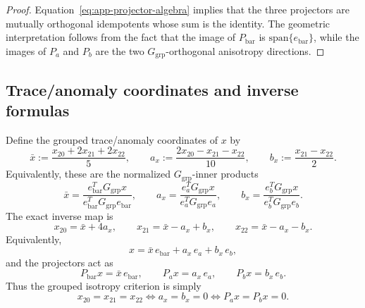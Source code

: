 \documentclass[11pt]{article}
\theoremstyle{definition}
\newcommand{\Span}{\mathrm{span}}
\begin{document}
\begin{proof}
Equation~\eqref{eq:app-projector-algebra} implies that the three projectors are mutually orthogonal idempotents whose sum is the identity. The geometric interpretation follows from the fact that the image of $P_{\mathrm{bar}}$ is $\Span\{e_{\mathrm{bar}}\}$, while the images of $P_a$ and $P_b$ are the two $G_{\mathrm{grp}}$-orthogonal anisotropy directions.
\end{proof}

\subsection{Trace/anomaly coordinates and inverse formulas}

Define the grouped trace/anomaly coordinates of $x$ by
\begin{equation}
 \bar x:=\frac{x_{20}+2x_{21}+2x_{22}}{5},
 \qquad
 a_x:=\frac{2x_{20}-x_{21}-x_{22}}{10},
 \qquad
 b_x:=\frac{x_{21}-x_{22}}{2}.
 \label{eq:app-trace-anomaly-def}
\end{equation}
Equivalently, these are the normalized $G_{\mathrm{grp}}$-inner products
\begin{equation}
 \bar x=\frac{e_{\mathrm{bar}}^T G_{\mathrm{grp}} x}{e_{\mathrm{bar}}^T G_{\mathrm{grp}} e_{\mathrm{bar}}},
 \qquad
 a_x=\frac{e_a^T G_{\mathrm{grp}} x}{e_a^T G_{\mathrm{grp}} e_a},
 \qquad
 b_x=\frac{e_b^T G_{\mathrm{grp}} x}{e_b^T G_{\mathrm{grp}} e_b}.
 \label{eq:app-trace-anomaly-inner-product}
\end{equation}
The exact inverse map is
\begin{equation}
 x_{20}=\bar x+4a_x,
 \qquad
 x_{21}=\bar x-a_x+b_x,
 \qquad
 x_{22}=\bar x-a_x-b_x.
 \label{eq:app-trace-anomaly-inverse}
\end{equation}
Equivalently,
\begin{equation}
 x=\bar x\,e_{\mathrm{bar}}+a_x\,e_a+b_x\,e_b,
 \label{eq:app-grouped-basis-expansion}
\end{equation}
and the projectors act as
\begin{equation}
 P_{\mathrm{bar}}x=\bar x\,e_{\mathrm{bar}},
 \qquad
 P_ax=a_x\,e_a,
 \qquad
 P_bx=b_x\,e_b.
 \label{eq:app-projector-action}
\end{equation}
Thus the grouped isotropy criterion is simply
\begin{equation}
 x_{20}=x_{21}=x_{22}
 \iff
 a_x=b_x=0
 \iff
 P_ax=P_bx=0.
 \label{eq:app-grouped-isotropy}
\end{equation}
\end{document}
